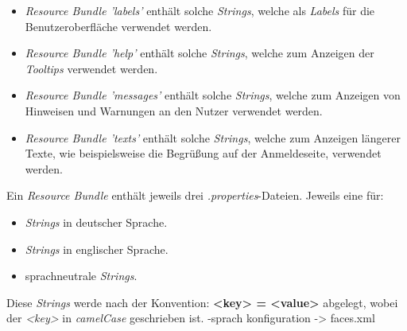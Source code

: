 \begin{itemize}
    \item \emph{Resource Bundle 'labels'} enthält solche \emph{Strings}, welche als \emph{Labels} für die Benutzeroberfläche verwendet
    werden.
    \item \emph{Resource Bundle 'help'} enthält solche \emph{Strings}, welche zum Anzeigen der \emph{Tooltips} verwendet
    werden.
    \item \emph{Resource Bundle 'messages'} enthält solche \emph{Strings}, welche zum Anzeigen von Hinweisen und Warnungen
    an den Nutzer verwendet werden.
    \item \emph{Resource Bundle 'texts'} enthält solche \emph{Strings}, welche zum Anzeigen längerer Texte, wie beispielsweise die
    Begrüßung auf der Anmeldeseite, verwendet werden.
\end{itemize}

Ein \emph{Resource Bundle} enthält jeweils drei \emph{.properties}-Dateien.
Jeweils eine für:
\begin{itemize}
    \item \emph{Strings} in deutscher Sprache.
    \item \emph{Strings} in englischer Sprache.
    \item sprachneutrale \emph{Strings}.
\end{itemize}

Diese \emph{Strings} werde nach der Konvention:
\textbf{<key> = <value>} %
abgelegt, wobei der \emph{<key>} in \emph{camelCase} geschrieben ist.
-sprach konfiguration -> faces.xml %

